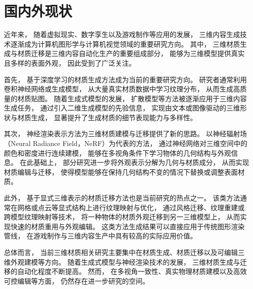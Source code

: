 \section{国内外现状}

近年来，
随着虚拟现实、数字孪生以及游戏制作等应用的发展，
三维内容生成技术逐渐成为计算机图形学与计算机视觉领域的重要研究方向。
其中，
三维材质生成与材质迁移是三维内容自动化生产的重要组成部分，
能够为三维模型提供真实且多样的表面外观，
因此受到了广泛关注。

首先，
基于深度学习的材质生成方法成为当前的重要研究方向。
研究者通常利用卷积神经网络或生成模型，
从大量真实材质数据中学习纹理分布，
从而生成高质量的材质贴图。
随着生成式模型的发展，
扩散模型等方法被逐渐应用于三维内容生成任务，
通过引入二维生成模型的先验信息，
实现由文本或图像驱动的三维形状与材质生成，
显著提升了生成材质的细节表现能力与多样性。

其次，
神经渲染表示方法为三维材质建模与迁移提供了新的思路。
以神经辐射场（Neural Radiance Field，NeRF）为代表的方法，
通过神经网络对三维空间中的颜色和密度进行连续建模，
能够在多视角条件下学习物体的几何结构与外观信息。
在此基础上，
部分研究进一步将外观表示分解为几何与材质成分，
从而实现材质编辑与迁移，
使得模型能够在保持几何结构不变的情况下替换或调整表面材质。

此外，
基于显式三维表示的材质迁移方法也是当前研究的热点之一。
该类方法通常在网格或点云等显式结构上进行纹理映射与优化，
通过风格迁移、纹理重建或跨模型纹理映射等技术，
将一种物体的材质外观迁移到另一三维模型上，
从而实现快速的材质重用与外观编辑。
这类方法生成结果可以直接应用于传统图形渲染管线，
在游戏制作与三维内容生产中具有较高的实际应用价值。

总体而言，
当前三维材质相关研究主要集中在材质生成、材质迁移以及可编辑三维外观建模等方向。
随着生成式模型与神经渲染技术的发展，
三维材质生成与迁移的自动化程度不断提高。
然而，
在多视角一致性、真实物理材质建模以及高效可控编辑等方面，
仍然存在进一步研究的空间。